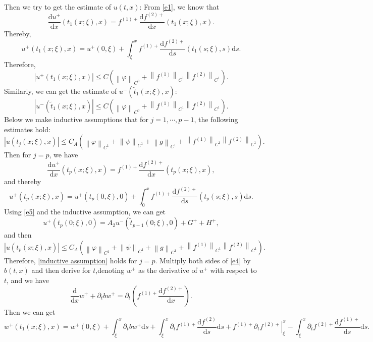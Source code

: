 \documentclass[a4paper,reqno,11pt]{amsart}
\numberwithin{equation}{section} %
\begin{document}
Then we try to get the estimate of $u(t,x)$:
From \eqref{e1}, we know that
$$
\frac{\mathrm{d}u^+}{\mathrm{d}x}\left( t_1(x;\xi ),x \right) =f^{\left( 1 \right) +}\frac{\mathrm{d}f^{\left( 2 \right) +}}{\mathrm{d}x}\left( t_1(x;\xi ),x \right) .
$$
Thereby,
$$
u^+\left( t_1\left( x;\xi \right) ,x \right) =u^+(0,\xi )+\int_{\xi}^x{f^{\left( 1 \right) +}\frac{\mathrm{d}f^{\left( 2 \right) +}}{\mathrm{d}s}\left( t_1\left( s;\xi \right) ,s \right) \mathrm{d}s.}
$$
Therefore,
$$
\left| u^+\left( t_1(x;\xi ),x \right) \right|\leq C\left( \left\| \varphi \right\| _{C^0}+\left\| f^{(1)} \right\| _{C^1}\left\| f^{(2)} \right\| _{C^1} \right) .
$$
Similarly, we can get the estimate of $u^-\left( \tilde{t} _1(x;\xi ),x \right) $:
$$
\left| u^-\left( \tilde{t} _1(x;\xi ),x \right) \right|\leq C\left( \left\| \varphi \right\| _{C^0}+\left\| f^{(1)} \right\| _{C^1}\left\| f^{(2)} \right\| _{C^1} \right) .
$$
Below we make inductive assumptions that for $j=1,\cdots,p-1$, the following estimates hold:
\begin{equation}\label{inductive assumption}
\left| u\left( t_j(x;\xi ),x \right) \right|\leq C_A\left( \left\| \varphi \right\| _{C^1}+\left\| \psi \right\| _{C^1}+\left\| g \right\| _{C^1}+\left\| f^{(1)} \right\| _{C^1}\left\| f^{(2)} \right\| _{C^1} \right) .
\end{equation}
Then for $j=p$, we have
$$
\frac{\mathrm{d}u^+}{\mathrm{d}x}\left( t_p(x;\xi ),x \right) =f^{(1)+}\frac{\mathrm{d}f^{(2)+}}{\mathrm{d}x}\left( t_p(x;\xi ),x \right) ,
$$
and thereby
$$
u^+\left( t_p\left( x;\xi \right) ,x \right) =u^+(t_p(0,\xi ),0)+\int_{0}^x{f^{(1)+}\frac{\mathrm{d}f^{(2)+}}{\mathrm{d}s}\left( t_p\left( s;\xi \right) ,s \right) \mathrm{d}s}.
$$
Using \eqref{e5} and the inductive assumption, we can get
$$
u^+\left(t_p(0 ; \xi), 0\right)=A_2 u^-\left(\tilde{t}_{p-1}(0 ; \xi), 0\right)+ G^+ + H^+ ,
$$
and then
$$
\left| u\left( t_p(x;\xi ),x \right) \right|\leq C_A\left( \left\| \varphi \right\| _{C^1}+\left\| \psi \right\| _{C^1}+\left\| g \right\| _{C^1}+\left\| f^{(1)} \right\| _{C^1}\left\| f^{(2)} \right\| _{C^1} \right) .
$$
Therefore, \eqref{inductive assumption} holds for $j=p$.
Multiply both sides of \eqref{e4} by $b(t,x)$ and then derive for $t$,denoting $w^+$ as the derivative of $u^+$ with respect to $t$, and we have
$$
\frac{\mathrm{d}}{\mathrm{d}x}w^++\partial _tbw^+=\partial _t\left( f^{(1)+}\frac{\mathrm{d}f^{(2)+}}{\mathrm{d}x} \right). 
$$
Then we can get
\begin{equation}\label{e of w^+ 1}
w^+\left( t_1(x;\xi ),x \right) =w^+(0,\xi )+\int_{\xi}^x{\partial _tbw^+\mathrm{d}s}+\int_{\xi}^x{\partial _tf^{(1)+}\frac{\mathrm{d}f^{(2)}}{\mathrm{d}s}\mathrm{d}s}+\left. f^{(1)+}\partial _tf^{(2)+} \right|_{\xi}^{x}-\int_{\xi}^x{\partial _t{f}^{(2)+}\frac{\mathrm{d}{f}^{(1)+}}{\mathrm{d}s}\mathrm{d}s}.
\end{equation}
\end{document}
